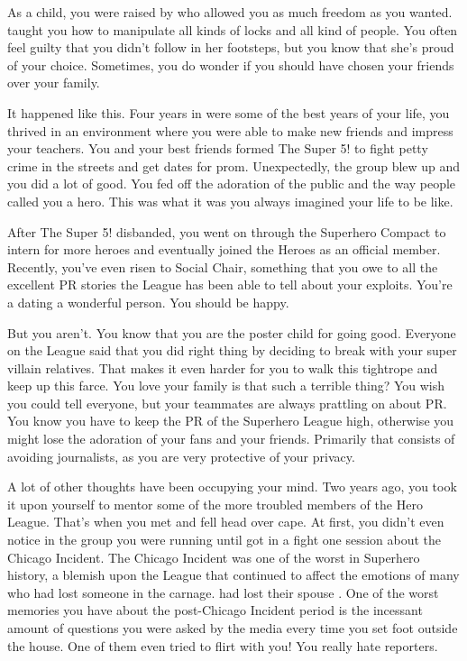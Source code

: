 \documentclass[char]{LRSguildcamp1}
\begin{document}
\name{\cYoungest{}}

As a child, you were raised by \cGrandma{} who allowed you as much freedom as you wanted. \cGrandma{} taught you how to manipulate all kinds of locks and all kind of people. You often feel guilty that you didn't follow in her footsteps, but you know that she's proud of your choice. Sometimes, you do wonder if you should have chosen your friends over your family. 

It happened like this. Four years in \pSuperSchool{} were some of the best years  of your life, you thrived in an environment where you were able to make new friends and impress your teachers. You and your best friends formed The Super 5! to fight petty crime in the streets and get dates for prom. Unexpectedly, the group blew up and you did a lot of good. You fed off the adoration of the public and the way people called you a hero. This was what it was you always imagined your life to be like.  
 
After The Super 5! disbanded, you went on through the Superhero Compact to intern for more heroes and eventually joined the Heroes as an official member. Recently, you've even risen to Social Chair, something that you owe to all the excellent PR stories the League has been able to tell about your exploits. You're a dating a wonderful person. You should be happy. 

But you aren't. You know that you are the poster child for going good.  Everyone on the League said that you did right thing by deciding to break with your super villain relatives. That makes it even harder for you to walk this tightrope and keep up this farce. You love your family is that such a terrible thing? You wish you could tell everyone, but your teammates are always prattling on about PR. You know you have to keep the PR of the Superhero League high, otherwise you might lose the adoration of your fans and your friends. Primarily that consists of avoiding journalists, as you are very protective of your privacy. 

A lot of other thoughts have been occupying your mind. Two years ago, you took it upon yourself to mentor some of the more troubled members of the Hero League. That's when you met \cYS{} and fell head over cape. At first, you didn't even notice \cYS{} in the group you were running until \cYS{} got in a fight one session about the Chicago Incident. The Chicago Incident was one of the worst in Superhero history, a blemish upon the League that continued to affect the emotions of many who had lost someone in the carnage. \cArchitect{} had lost their spouse \cAS{}. One of the worst memories you have about the post-Chicago Incident period is the incessant amount of questions you were asked by the media every time you set foot outside the house. One of them even tried to flirt with you! You really hate reporters.  
\end{document}
